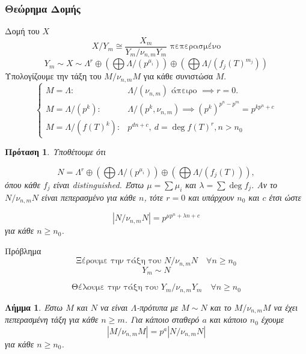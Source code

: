 \documentclass{beamer}
\newcommand {\tl}{\textlatin}
\newtheorem{lhmma}{Λήμμα}
\newtheorem{prop}{Πρόταση}
\begin{document}
\begin{frame}
\frametitle{Θεώρημα Δομής}
\begin{block}{Δομή του $X$}
    $$X/Y_m \cong \frac{X_m}{Y_m/\nu_{n,m}Y_m}\text{ πεπερασμένο} $$
    $$Y_m \sim X \sim \Lambda^r \oplus \left( \bigoplus \Lambda/(p^{\mu_i})\right) \oplus \left(\bigoplus \Lambda/(f_j(T)^{m_j})\right)$$
    Υπολογίζουμε την τάξη του $M/\nu_{n,m}M$ για κάθε συνιστώσα $M$.
    \pause 
    $$\begin{cases}
    M = \Lambda: & \Lambda/(\nu_{n,m}) \text{ άπειρο } \implies r= 0. \\ 
    M = \Lambda/(p^k): & \Lambda/(p^k, \nu_{n,m}) \implies (p^k)^{p^n-p^m} = p^{kp^n + c} \\
    M = \Lambda/(f(T)^k): & p^{dn+c}, \ d = \deg f(T)^r, n > n_0
    \end{cases}$$
\end{block}
\end{frame}

\begin{frame}

\begin{prop}
    Υποθέτουμε ότι 

    $$N = \Lambda^r \oplus \left( \bigoplus \Lambda/(p^{\mu_i})\right) \oplus \left(\bigoplus \Lambda/(f_j(T))\right),$$ όπου κάθε $f_j$ είναι \tl{distinguished}. Έστω $\mu = \sum \mu_i$ και $\lambda = \sum \deg f_j$. Αν το $N/\nu_{n,m}N$ είναι πεπερασμένο για κάθε $n$, τότε $r=0$ και υπάρχουν $n_0$ και $c$ έτσι ώστε

    $$|N/\nu_{n,m}N| = p^{\mu p^n + \lambda n + c}$$ για κάθε $n\geq n_0$.
\end{prop}
\end{frame}
\begin{frame}
\begin{block}{Πρόβλημα}
$$\text{Ξέρουμε την τάξη του } N/\nu_{n,m}N \quad \forall n \geq n_0$$
$$Y_m \sim N$$

$$\text{Θέλουμε την τάξη του } Y_m/\nu_{n,m}Y_m \quad \forall n \geq n_0$$
\end{block}
\pause
\begin{lhmma}
    Έστω $M$ και $N$ να είναι $\Lambda$-πρότυπα με $M\sim N$ και το $M/\nu_{n,m}M$ να έχει πεπερασμένη τάξη για κάθε $n\geq m$. Για κάποιο σταθερό $a$ και κάποιο $n_0$ έχουμε
    $$ |M/\nu_{n,m}M| = p^a |N/\nu_{n,m}N|$$ για κάθε $n\geq n_0$. 
\end{lhmma}

\end{frame}
\end{document}
